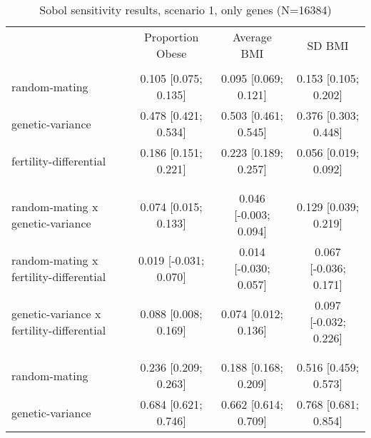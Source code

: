 
    \begin{table}[htp]
    \renewcommand{\arraystretch}{1.3}
    \setlength{\tabcolsep}{3pt}
    \caption{Sobol sensitivity results, scenario 1, only genes (N=16384)}
    \label{tab:sobol-snp}
    \footnotesize
    \centering
    \begin{threeparttable}
    \begin{tabular}{lccc}
    \hline
    \addlinespace
    & Proportion Obese & Average BMI & SD BMI \\
    \addlinespace
    \hline
    \addlinespace[6pt]
    \multicolumn{4}{l}{\hspace{1em} S1} \\
\hspace{1.5em} random-mating & 0.105 [0.075; 0.135]   & 0.095 [0.069; 0.121]   & 0.153 [0.105; 0.202] \\
	  \hspace{1.5em} genetic-variance & 0.478 [0.421; 0.534]   & 0.503 [0.461; 0.545]   & 0.376 [0.303; 0.448] \\
	  \hspace{1.5em} fertility-differential & 0.186 [0.151; 0.221]   & 0.223 [0.189; 0.257]   & 0.056 [0.019; 0.092] \\
	 \\
    \addlinespace[12pt]
    \multicolumn{4}{l}{\hspace{1em} S2} \\ 
\hspace{1.5em} random-mating x genetic-variance & 0.074 [0.015; 0.133]   & 0.046 [-0.003; 0.094]   & 0.129 [0.039; 0.219] \\
	  \hspace{1.5em} random-mating x fertility-differential & 0.019 [-0.031; 0.070]   & 0.014 [-0.030; 0.057]   & 0.067 [-0.036; 0.171] \\
	  \hspace{1.5em} genetic-variance x fertility-differential & 0.088 [0.008; 0.169]   & 0.074 [0.012; 0.136]   & 0.097 [-0.032; 0.226] \\
	 \\
    \addlinespace[12pt]
    \multicolumn{4}{l}{\hspace{1em} ST} \\ 
\hspace{1.5em} random-mating & 0.236 [0.209; 0.263]   & 0.188 [0.168; 0.209]   & 0.516 [0.459; 0.573] \\
	  \hspace{1.5em} genetic-variance & 0.684 [0.621; 0.746]   & 0.662 [0.614; 0.709]   & 0.768 [0.681; 0.854] \\

\end{tabular}
\end{threeparttable}
\end{table}
